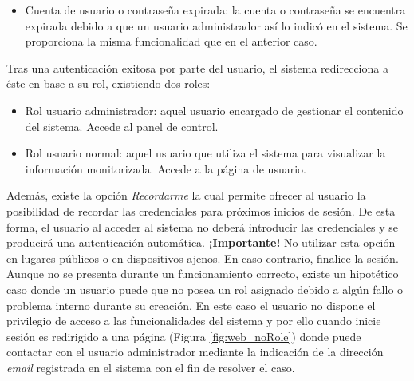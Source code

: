 \documentclass[12pt,a4paper, twoside]{report}
\begin{document}
\begin{itemize}
		
		\item Cuenta de usuario o contraseña expirada: la cuenta o contraseña se encuentra expirada debido a que un usuario administrador así lo indicó en el sistema. Se proporciona la misma funcionalidad que en el anterior caso.
	\end{itemize}
	
	Tras una autenticación exitosa por parte del usuario, el sistema redirecciona a éste en base a su rol, existiendo dos roles:
	
	\begin{itemize}
		\item Rol usuario administrador: aquel usuario encargado de gestionar el contenido del sistema. Accede al panel de control.
		\item Rol usuario normal: aquel usuario que utiliza el sistema para visualizar la información monitorizada. Accede a la página de usuario.
	\end{itemize}
	
	Además, existe la opción \textit{Recordarme} la cual permite ofrecer al usuario la posibilidad de recordar las credenciales para próximos inicios de sesión. De esta forma, el usuario al acceder al sistema no deberá introducir las credenciales y se producirá una autenticación automática. \textbf{¡Importante!} No utilizar esta opción en lugares públicos o en dispositivos ajenos. En caso contrario, finalice la sesión. \\
	
	Aunque no se presenta durante un funcionamiento correcto, existe un hipotético caso donde un usuario puede que no posea un rol asignado debido a algún fallo o problema interno durante su creación. En este caso el usuario no dispone el privilegio de acceso a las funcionalidades del sistema y por ello cuando inicie sesión es redirigido a una página (Figura \ref{fig:web_noRole}) donde puede contactar con el usuario administrador mediante la indicación de la dirección \textit{email} registrada en el sistema con el fin de resolver el caso.
	
	
\end{document}
